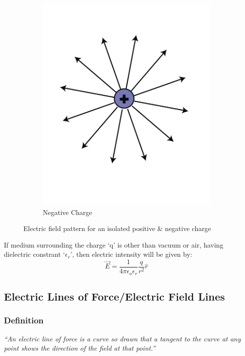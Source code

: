 \begin{figure}[htbp]
\begin{subfigure}[b]{0.3\textwidth}
      \includegraphics[width=\textwidth]{Images/11.4b}
      \caption{Negative Charge}
      \label{fig:11.4b}
  \end{subfigure}
  \caption[]{Electric field pattern for an isolated positive \& negative charge}
  \label{fig:11.4}
\end{figure}

If medium surrounding the charge ‘q’ is other than vacuum or air,
having dielectric constrant
`$\epsilon_{r}$', then electric intensity will be given by:
\begin{equation}\label{eq:11.16}
  \vec{E} = \frac{1}{4\pi\epsilon_{o}\epsilon_{r}} \frac{q}{r^{2}} \hat{r}
\end{equation}
\subsection{Electric Lines of Force/Electric Field Lines}
\subsubsection{Definition}
\textit{“An electric line of force is a curve so drawn that a tangent to the curve at any point
shows the direction of the field at that point.”}
